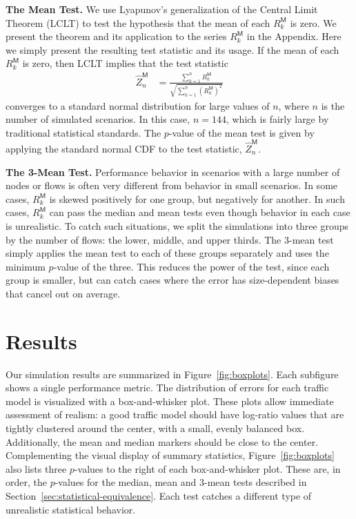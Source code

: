 \documentclass[conference]{IEEEtran}
\newcommand{\caps}[1]{{\small{#1}}}
\newcommand{\M}{\mathsf{M}}
\begin{document}
\textbf{The Mean Test.} We use Lyapunov's generalization of the Central Limit Theorem (\caps{LCLT}) to test the hypothesis that the mean of each $R_k^\M$ is zero. We present the theorem and its application to the series $R_k^\M$ in the Appendix. Here we simply present the resulting test statistic and its usage. If the mean of each $R_k^\M$ is zero, then \caps{LCLT} implies that the test statistic
\begin{align}
\hat{Z}_n^\M &= \frac{\sum_{k=1}^n{R_k^\M}}{\sqrt{\sum_{k=1}^n{(R_k^\M)^2}}}
\end{align}
converges to a standard normal distribution for large values of $n$, where $n$ is the number of simulated scenarios. In this case, $n=144$, which is fairly large by traditional statistical standards. The $p$-value of the mean test is given by applying the standard normal \caps{CDF} to the test statistic, $\hat{Z}_n^\M$.

\textbf{The 3-Mean Test.} Performance behavior in scenarios with a large number of nodes or flows is often very different from behavior in small scenarios. In some cases, $R_k^\M$ is skewed positively for one group, but negatively for another. In such cases, $R_k^\M$ can pass the median and mean tests even though behavior in each case is unrealistic. To catch such situations, we split the simulations into three groups by the number of flows: the lower, middle, and upper thirds. The 3-mean test simply applies the mean test to each of these groups separately and uses the minimum $p$-value of the three. This reduces the power of the test, since each group is smaller, but can catch cases where the error has size-dependent biases that cancel out on average.

\section{Results}\label{sec:results}

Our simulation results are summarized in Figure~\ref{fig:boxplots}. Each subfigure shows a single performance metric. The distribution of errors for each traffic model is visualized with a box-and-whisker plot. These plots allow immediate assessment of realism: a good traffic model should have log-ratio values that are tightly clustered around the center, with a small, evenly balanced box. Additionally, the mean and median markers should be close to the center. Complementing the visual display of summary statistics, Figure~\ref{fig:boxplots} also lists three $p$-values to the right of each box-and-whisker plot. These are, in order, the $p$-values for the median, mean and 3-mean tests described in Section~\ref{sec:statistical-equivalence}. Each test catches a different type of unrealistic statistical behavior.
\end{document}
